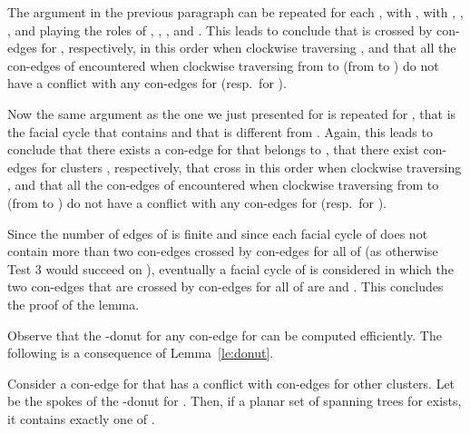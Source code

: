 \documentclass[letter,runningheads]{llncs}
\renewenvironment{proof}
{{\em Proof.\ }}{\hspace*{\fill}\par\vspace{2mm}}
\begin{document}
\begin{proof}
The argument in the previous paragraph can be repeated for each , with , with , , , and  playing the roles of  , , , and . This leads to conclude that  is crossed by con-edges  for , respectively, in this order when clockwise traversing , and that all the con-edges of  encountered when clockwise traversing  from  to  (from  to ) do not have a conflict with any con-edges for  (resp.\ for ).

Now the same argument as the one we just presented for  is repeated for , that is the facial cycle that contains  and that is different from . Again, this leads to conclude that there exists a con-edge  for  that belongs to , that there exist con-edges  for clusters , respectively, that cross  in this order when clockwise traversing , and that all the con-edges of  encountered when clockwise traversing  from  to  (from  to ) do not have a conflict with any con-edges for  (resp.\ for ).

Since the number of edges of  is finite and since each facial cycle of  does not contain more than two con-edges crossed by con-edges for all of  (as otherwise {\sc Test 3} would succeed on ), eventually a facial cycle  of  is considered in which the two con-edges that are crossed by con-edges for all of  are  and . This concludes the proof of the lemma.
\end{proof}

Observe that the -donut for any con-edge  for  can be computed efficiently. The following is a consequence of Lemma~\ref{le:donut}.

\begin{lemma} \label{le:exactly-one}
Consider a con-edge  for  that has a conflict with  con-edges for other clusters. Let  be the spokes of the -donut for . Then, if a planar set  of spanning trees for  exists, it contains exactly one of .
\end{lemma}
\end{document}
